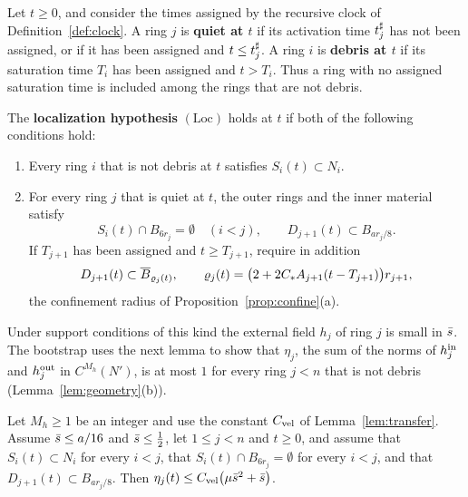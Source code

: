 \begin{definition}
\label{def:loc}
Let $t\ge0$, and consider the times assigned by the recursive clock of
Definition~\ref{def:clock}. A ring $j$ is \textbf{quiet at $t$} if its
activation time $t^\sharp_j$ has not been assigned, or if it has been assigned
and $t\le t^\sharp_j$. A ring $i$ is \textbf{debris at $t$} if its saturation time
$T_i$ has been assigned and $t>T_i$. Thus a ring with no assigned saturation
time is included among the rings that are not debris.

The \textbf{localization hypothesis} $(\mathrm{Loc})$ holds at $t$ if both
of the following conditions hold:
\begin{enumerate}[label=\textup{(\arabic*)}]
\item Every ring $i$ that is not debris at $t$ satisfies $S_i(t)\subset N_i$.
\item For every ring $j$ that is quiet at $t$, the outer rings and the inner
  material satisfy
  \[
  S_i(t)\cap B_{6r_j}=\emptyset\quad(i<j),\qquad
  D_{j+1}(t)\subset B_{ar_j/8}.
  \]
  If $T_{j+1}$ has been assigned and $t\ge T_{j+1}$, require in addition
  \[
  D_{j+1}(t)\subset\overline B_{\varrho_j(t)},\qquad
  \varrho_j(t)=\big(2+2C_{*} A_{j+1}(t-T_{j+1})\big)r_{j+1},
  \]
  the confinement radius of Proposition~\ref{prop:confine}\textup{(a)}.
\end{enumerate}
\end{definition}

Under support conditions of this kind the external field $h_j$ of ring $j$ is
small in $\bar s$. The bootstrap uses the next lemma to show that $\eta_j$, the
sum of the norms of $h^{\mathrm{in}}_j$ and $h^{\mathrm{out}}_j$ in $C^{M_h}(N')$, is at most $1$ for every ring $j<n$ that is not debris
(Lemma~\ref{lem:geometry}\textup{(b)}).

\begin{lemma}
\label{lem:field-bound}
Let $M_h\ge1$ be an integer and use the constant $C_{\mathrm{vel}}$ of
Lemma~\ref{lem:transfer}. Assume
$\bar s\le a/16$ and $\bar s\le\frac12$, let $1\le j<n$ and $t\ge0$, and
assume that $S_i(t)\subset N_i$ for every $i<j$, that $S_i(t)\cap B_{6r_j}=\emptyset$
for every $i<j$, and that $D_{j+1}(t)\subset B_{ar_j/8}$. Then
$\eta_j(t)\le C_{\mathrm{vel}}\big(\mu\bar s^2+\bar s\big)$.
\end{lemma}

